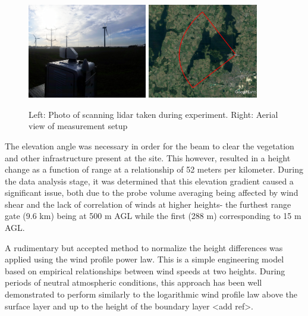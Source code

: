 \begin{figure}[htbp]
    \centering
        \includegraphics[width=0.465\textwidth]{graphics/results/waffle/waffle_field_photo.png}        \includegraphics[width=0.43\textwidth]{graphics/results/waffle/experiment_overview_crop.png}
    \caption{Left: Photo of scanning lidar taken during experiment. Right: Aerial view of measurement setup}
    \label{fig:waffle_experiment_setup}
\end{figure}

The elevation angle was necessary in order for the beam to clear the vegetation and other infrastructure present at the site. This however, resulted in a height change as a function of range at a relationship of 52 meters per kilometer. During the data analysis stage, it was determined that this elevation gradient caused a significant issue, both due to the probe volume averaging being affected by wind shear and the lack of correlation of winds at higher heights- the furthest range gate (9.6 km) being at 500 m AGL while the first (288 m) corresponding to 15 m AGL. 

A rudimentary but accepted method to normalize the height differences was applied using the wind profile power law. This is a simple engineering model based on empirical relationships between wind speeds at two heights. During periods of neutral atmospheric conditions, this approach has been well demonstrated to perform similarly to the logarithmic wind profile law above the surface layer and up to the height of the boundary layer <add ref>.

